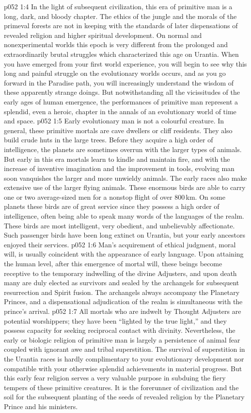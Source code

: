 \vs p052 1:4 In the light of subsequent civilization, this era of primitive man is a long, dark, and bloody chapter. The ethics of the jungle and the morals of the primeval forests are not in keeping with the standards of later dispensations of revealed religion and higher spiritual development. On normal and nonexperimental worlds this epoch is very different from the prolonged and extraordinarily brutal struggles which characterized this age on Urantia. When you have emerged from your first world experience, you will begin to see why this long and painful struggle on the evolutionary worlds occurs, and as you go forward in the Paradise path, you will increasingly understand the wisdom of these apparently strange doings. But notwithstanding all the vicissitudes of the early ages of human emergence, the performances of primitive man represent a splendid, even a heroic, chapter in the annals of an evolutionary world of time and space.
\vs p052 1:5 \pc Early evolutionary man is not a colourful creature. In general, these primitive mortals are cave dwellers or cliff residents. They also build crude huts in the large trees. Before they acquire a high order of intelligence, the planets are sometimes overrun with the larger types of animals. But early in this era mortals learn to kindle and maintain fire, and with the increase of inventive imagination and the improvement in tools, evolving man soon vanquishes the larger and more unwieldy animals. The early races also make extensive use of the larger flying animals. These enormous birds are able to carry one or two average\hyp{}sized men for a nonstop flight of over 800\,km. On some planets these birds are of great service since they possess a high order of intelligence, often being able to speak many words of the languages of the realm. These birds are most intelligent, very obedient, and unbelievably affectionate. Such passenger birds have been long extinct on Urantia, but your early ancestors enjoyed their services.
\vs p052 1:6 \pc Man’s acquirement of ethical judgment, moral will, is usually coincident with the appearance of early language. Upon attaining the human level, after this emergence of mortal will, these beings become receptive to the temporary indwelling of the divine Adjusters, and upon death many are duly elected as survivors and sealed by the archangels for subsequent resurrection and Spirit fusion. The archangels always accompany the Planetary Princes, and a dispensational adjudication of the realm is simultaneous with the prince’s arrival.
\vs p052 1:7 All mortals who are indwelt by Thought Adjusters are potential worshippers; they have been “lighted by the true light,” and they possess capacity for seeking reciprocal contact with divinity. Nevertheless, the early or biologic religion of primitive man is largely a persistence of animal fear coupled with ignorant awe and tribal superstition. The survival of superstition in the Urantia races is hardly complimentary to your evolutionary development nor compatible with your otherwise splendid achievements in material progress. But this early fear religion serves a very valuable purpose in subduing the fiery tempers of these primitive creatures. It is the forerunner of civilization and the soil for the subsequent planting of the seeds of revealed religion by the Planetary Prince and his ministers.
